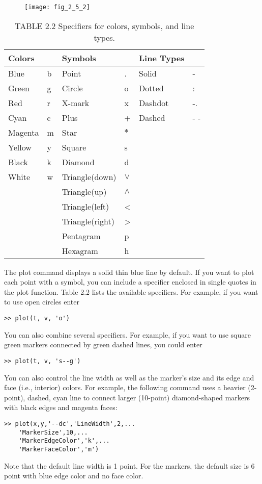 \documentclass[../main.tex]{subfiles}
\begin{document}
\begin{figure}[H]
	\centering
	\texttt{[image: fig\_2\_5\_2]}
   
\end{figure}

\begin{table}[H]
	\caption*{TABLE 2.2 Specifiers for colors, symbols, and line types.}
	\centering
	\begin{tabular}{l l l l l l }
		\hline

		Colors && Symbols&& Line Types&\\
		\hline
		Blue& b  &Point &.  &Solid& -\\
		Green& g& Circle& o&  Dotted& :\\
		Red& r &X-mark &x &Dashdot& -.\\
		Cyan &c &Plus &+ &Dashed& - -\\
		Magenta &m &Star& $ \ast $&&\\
		Yellow& y& Square& s&& \\
		Black& k &Diamond& d&& \\
		White& w &Triangle(down)& $\vee$ && \\
		&&Triangle(up) &$\wedge$ && \\
		&&Triangle(left)& <&& \\
		&&Triangle(right) &>&& \\
		&&Pentagram& p&& \\
		&&Hexagram& h&& \\
		\hline
	\end{tabular}	
\end{table}


The plot command displays a solid thin blue line by default. If you want to plot each
point with a symbol, you can include a specifier enclosed in single quotes in the plot 
function. Table 2.2 lists the available specifiers. For example, if you want to use open circles enter
\begin{lstlisting}[frame=none, numbers=none]
	>> plot(t, v, 'o')
\end{lstlisting}
You can also combine several specifiers. For example, if you want to use square green
markers connected by green dashed lines, you could enter
\begin{lstlisting}[frame=none, numbers=none]
	>> plot(t, v, 's--g')
\end{lstlisting}
You can also control the line width as well as the marker's size and its edge and face (i.e.,
interior) colors. For example, the following command uses a heavier (2-point), dashed,
cyan line to connect larger (10-point) diamond-shaped markers with black edges and
magenta faces:
\begin{lstlisting}[frame=none, numbers=none]
	>> plot(x,y,'--dc','LineWidth',2,...
	'MarkerSize',10,...
	'MarkerEdgeColor','k',...
	'MarkerFaceColor','m')
\end{lstlisting}
Note that the default line width is 1 point. For the markers, the default size is 6 point with
blue edge color and no face color.
\end{document}

